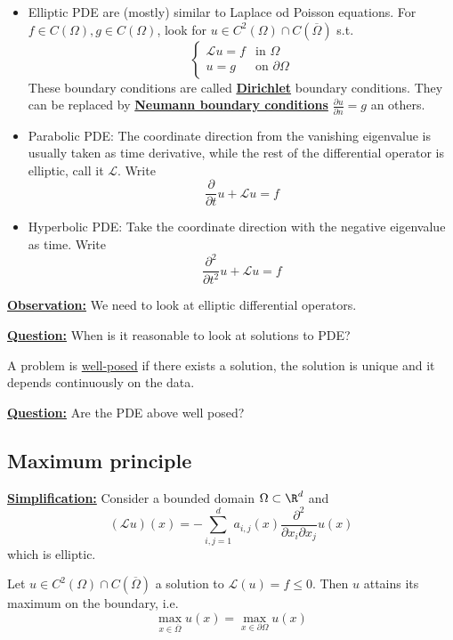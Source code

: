 \begin{itemize}
    \item Elliptic PDE are (mostly) similar to Laplace od Poisson equations. For $f\in C(\Omega),g\in C(\Omega)$, look for $u\in C^2(\Omega)\cap C(\overline{\Omega})$ s.t. \[\begin{cases}
        \mathcal{L}u=f & \text{in } \Omega\\
        u=g & \text{on } \partial \Omega
    \end{cases}\] These boundary conditions are called \underline{\textbf{Dirichlet}} boundary conditions. They can be replaced by  \underline{\textbf{Neumann boundary conditions}} $\frac{\partial u}{\partial n}=g$ an others.
    \item Parabolic PDE: The coordinate direction from the vanishing eigenvalue is usually taken as time derivative, while the rest of the differential operator is elliptic, call it $\mathcal{L}$. Write\[\frac{\partial}{\partial t}u+\mathcal{L}u=f\]
    \item Hyperbolic PDE: Take the coordinate direction with the negative eigenvalue as time. Write \[\frac{\partial^2}{\partial t^2}u+\mathcal{L}u=f\]
\end{itemize}

\underline{\textbf{Observation:}} We need to look at elliptic differential operators.

\underline{\textbf{Question:}} When is it reasonable to look at solutions to PDE?

\begin{definition}
    A problem is \underline{well-posed} if there exists a solution, the solution is unique and it depends continuously on the data.  
\end{definition}

\underline{\textbf{Question:}} Are the PDE above well posed?

\subsection{Maximum principle}

\underline{\textbf{Simplification:}} Consider a bounded domain $\Omega\subset \R^d$ and
\begin{equation}
    (\mathcal{L}u)(x)=-\sum_{i,j=1}^d a_{i,j}(x)\frac{\partial^2}{\partial x_i \partial x_j}u(x)
\end{equation}
which is elliptic.

\begin{theorem}
    Let $u\in C^2(\Omega)\cap C(\overline{\Omega})$ a solution to $\mathcal{L}(u)=f\leq 0$. Then $u$ attains its maximum on the boundary, i.e. 
    \[\max_{x\in \overline{\Omega}}u(x)=\max_{x\in\partial \Omega} u(x)\]
\end{theorem}

